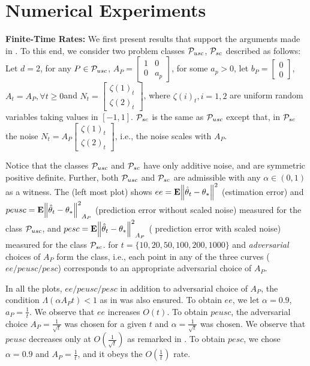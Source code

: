 \section{Numerical Experiments}\label{sec:exp}

\textbf{Finite-Time Rates:} We first present results that support the arguments made in . To this end, we consider two problem classes $\P_{usc}$, $\P_{sc}$ described as follows: Let $d=2$, for any $P\in \P_{usc}$, $A_P=\left[\begin{matrix}1 &0\\ 0 & a_p\end{matrix}\right]$, for some $a_p>0$, let $b_P=\left[\begin{matrix}0\\0\end{matrix}\right]$, $A_t=A_P,\forall t\geq 0$and $N_t=\left[\begin{matrix}\zeta(1)_t\\ \zeta(2)_t\end{matrix}\right]$, where $\zeta(i)_t, i=1,2$ are \iid uniform random variables taking values in $[-1,1]$. $\P_{sc}$ is the same as $\P_{usc}$ except that, in $\P_{sc}$ the noise $N_t=A_P \left[\begin{matrix}\zeta(1)_t\\ \zeta(2)_t\end{matrix}\right]$, i.e., the noise scales with $A_P$.

Notice that the classes $\P_{usc}$ and $\P_{sc}$ have only additive noise, and are symmetric positive definite. Further,  both $\P_{usc}$ and $\P_{sc}$ are admissible with any $\alpha\in(0,1)$ as a witness. The  (left most plot) shows $ee=\E{\norm{\thh_t-\ts}^2}$ (estimation error) and $peusc=\E{\norm{\thh_t-\ts}^2}_{A_P}$ (prediction error without scaled noise) measured for the class $\P_{usc}$,  and $pesc=\E{\norm{\thh_t-\ts}^2}_{A_P}$ ( prediction error with scaled noise)  measured for the class $\P_{sc}$. for $t=\{10,20,50,100,200,1000\}$ and \emph{adversarial} choices of $A_P$ form the class, i.e., each point in any of the three curves ($ee/peusc/pesc$) corresponds to an appropriate adversarial choice of $A_P$. 

In all the plots, $ee/peusc/pesc$ in addition to adversarial choice of $A_P$, the condition $\Lambda(\alpha A_P t )<1$ as in  was also ensured. 
To obtain $ee$, we let $\alpha=0.9$, $a_P=\frac{1}{t}$. We observe that $ee$ increases $O(t)$. To obtain $peusc$, the adversarial choice $A_P=\frac{1}{\sqrt{t}}$ was chosen for a given $t$ and $\alpha=\frac{1}{\sqrt{t}}$ was chosen. We observe that $peusc$ decreases only at $O(\frac{1}{\sqrt{t}})$ as remarked in . To obtain $pesc$, we chose $\alpha=0.9$ and $A_P=\frac{1}{t}$, and it obeys the $O(\frac{1}{t})$ rate.

